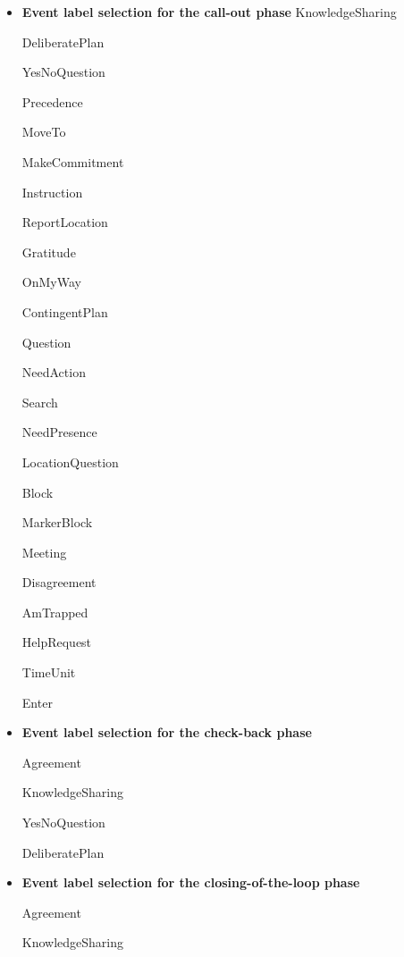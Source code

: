 \documentclass[11pt]{article}
\begin{document}
\begin{itemize}
  \item \textbf{Event label selection for the call-out phase}
    KnowledgeSharing
    
    DeliberatePlan
    
    YesNoQuestion
    
    Precedence
    
    MoveTo
    
    MakeCommitment
    
    Instruction
    
    ReportLocation
    
    Gratitude
    
    OnMyWay
    
    ContingentPlan
    
    Question
    
    NeedAction
    
    Search
    
    NeedPresence
    
    LocationQuestion
    
    Block
    
    MarkerBlock
    
    Meeting
    
    Disagreement
    
    AmTrapped
    
    HelpRequest
    
    TimeUnit
    
    Enter
  \item \textbf{Event label selection for the check-back phase}

    Agreement

    KnowledgeSharing
    
    YesNoQuestion
    
    DeliberatePlan

  \item \textbf{Event label selection for the closing-of-the-loop phase}
  
    Agreement

    KnowledgeSharing
  
\end{itemize}
\end{document}
